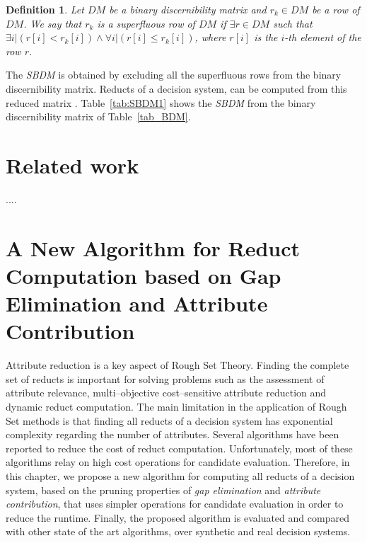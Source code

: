 \documentclass[letterpaper, twoside, openright, 12pt]{book}%
\newtheorem{definition}{Definition}
\begin{document}
	  \begin{definition}\label{def:basic_row}
		Let $DM$ be a binary discernibility matrix and $r_k \in DM$ be a row of $DM$. We say that $r_k$ is a superfluous row of $DM$ if $\exists r \in DM$ such that\\ $\exists i | (r[i] < r_k[i]) \wedge \forall i | (r[i] \leq r_k[i])$, where $r[i]$ is the $i$-th element of the row $r$.
	
	  \end{definition}
	
	  The \textit{SBDM} is obtained by excluding all the superfluous rows from the binary discernibility matrix. Reducts of a decision system, can be computed from this reduced matrix \citep{Yao09}. Table~\ref{tab:SBDM1} shows the \textit{SBDM} from the binary discernibility matrix of Table~\ref{tab_BDM}.

\newpage 
\chapter{Related work} \label{chap:RelatedWork} 
....

\newpage 
%
\chapter[GCreduct]{A New Algorithm for Reduct Computation based on Gap Elimination and Attribute Contribution} \label{chap:GCreduct} 
%
	Attribute reduction is a key aspect of Rough Set Theory.  Finding the complete set of reducts is important for solving problems such as the assessment of attribute relevance, multi--objective cost--sensitive attribute reduction and dynamic reduct computation. The main limitation in the application of Rough Set methods is that finding all reducts of a decision system has exponential complexity regarding the number of attributes. Several algorithms have been reported to reduce the cost of reduct computation. Unfortunately, most of these algorithms relay on high cost operations for candidate evaluation. Therefore, in this chapter, we propose a new algorithm for computing all reducts of a decision system, based on the pruning properties of \textit{gap  elimination} and \textit{attribute contribution}, that uses simpler operations for candidate evaluation in order to reduce the runtime. Finally, the proposed algorithm is evaluated and compared with other state of the art algorithms, over synthetic and real decision systems.

%	
\end{document}

